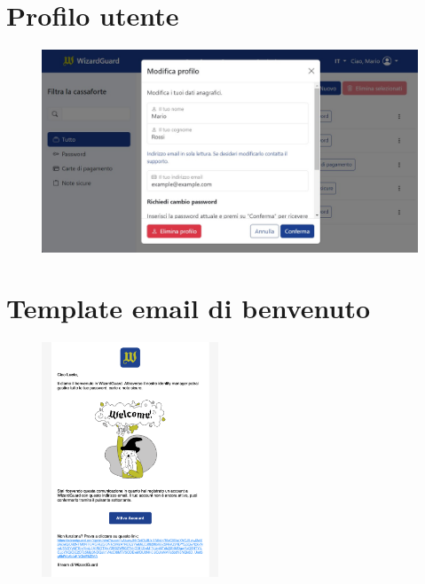 \documentclass[a4paper]{report}
\begin{document}
\section{Profilo utente}
\begin{figure}[H]
        \centering
        \includegraphics[width=1.0\textwidth]{figures/interfaces/profile}
    \end{figure}
\section{Template email di benvenuto}
\begin{figure}[H]
        \centering
        \includegraphics[width=0.47\textwidth]{figures/interfaces/welcomeEmail}
    \end{figure}
\end{document}
